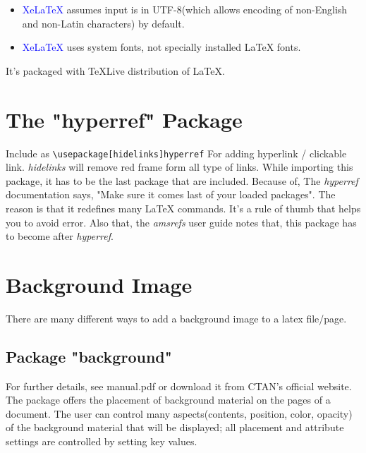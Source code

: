\begin{itemize}
	\item \textcolor{blue}{XeLaTeX} assumes input is in UTF-8(which allows encoding of non-English and non-Latin characters) by default.
	\item \textcolor{blue}{XeLaTeX} uses system fonts, not specially installed \LaTeX{} fonts.
\end{itemize}

It's packaged with TeXLive distribution of \LaTeX{}.

\section{The "hyperref" Package}
Include as \texttt{\textbackslash usepackage[hidelinks]{hyperref}} For adding hyperlink / clickable link. \textit{hidelinks} will remove red frame form all type of links. While importing this package, it has to be the last package that are included. Because of, The \textit{hyperref} documentation says, "Make sure it comes last of your loaded packages". The reason is that it redefines many \LaTeX{} commands. It's a rule of thumb that helps you to avoid error. Also that, the \textit{amsrefs} user guide notes that, this package has to become after \textit{hyperref}.

\section{Background Image}
There are many different ways to add a background image to a latex file/page.

\subsection{Package "background"}
For further details, see manual.pdf or download it from CTAN's official website. The package offers the placement of background material on the pages of a document. The user can control many aspects(contents, position, color, opacity) of the background material that will be displayed; all placement and attribute settings are controlled by setting key values.